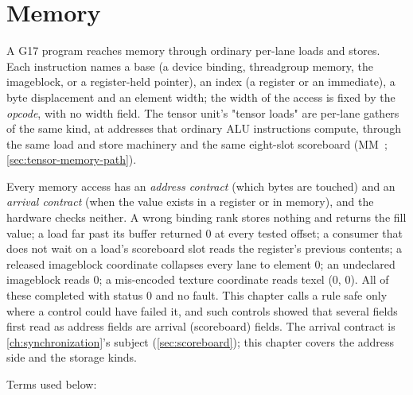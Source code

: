 \chapter{Memory}\label{ch:memory}

A G17 program reaches memory through ordinary per-lane loads and stores. Each instruction names a
base (a device binding, threadgroup memory, the imageblock, or a register-held pointer), an index (a register or an
immediate), a byte displacement and an element width; the width of the access is fixed by the \emph{opcode}, with no width field.
The tensor unit's "tensor loads" are per-lane gathers of the same kind, at addresses that ordinary ALU instructions
compute, through the same load and store machinery and the same eight-slot scoreboard (MM~;
\cref{sec:tensor-memory-path}).

Every memory access has an \emph{address
contract} (which bytes are touched) and an \emph{arrival contract} (when the value exists in a register or in memory),
and the hardware checks neither. A wrong binding rank stores nothing and returns the fill value; a load far past its
buffer returned 0 at every tested offset; a consumer that does not wait on a load's scoreboard slot reads the register's previous contents; a
released imageblock coordinate collapses every lane to element 0; an undeclared imageblock reads 0; a mis-encoded
texture coordinate reads texel (0, 0). All of these completed with status 0 and no fault. This chapter calls a rule
safe only where a control could have failed it, and such controls showed that several fields first read as address
fields are arrival (scoreboard) fields. The
arrival contract is \cref{ch:synchronization}'s subject (\cref{sec:scoreboard}); this chapter covers the address side and the storage kinds.

Terms used below:

